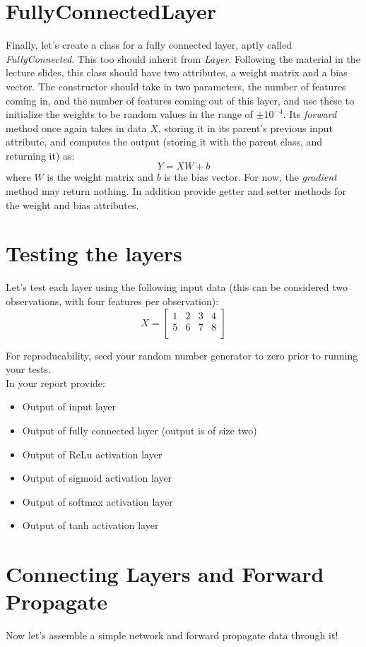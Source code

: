 \documentclass[12pt]{article}
\begin{document}
\section{FullyConnectedLayer}
Finally, let's create a class for a fully connected layer, aptly called \emph{FullyConnected}.  This too should inherit from \emph{Layer}.  Following the material in the lecture slides, this class should have two attributes, a weight matrix and a bias vector.  The constructor should take in two parameters, the number of features coming in, and the number of features coming out of this layer, and use these to initialize the weights to be random values in the range of $\pm 10^{-4}$.   Its \emph{forward} method once again takes in data $X$, storing it in its parent's previous input attribute, and computes the output (storing it with the parent class, and returning it) as:
$$Y = XW+b$$
where $W$ is the weight matrix and $b$ is the bias vector.  For now, the \emph{gradient} method may return nothing.  In addition provide getter and setter methods for the weight and bias attributes.
\newpage
\section{Testing the layers}
Let's test each layer using the following input data (this can be considered two observations, with four features per observation):
$$X = \begin{bmatrix}
1 & 2 & 3 & 4\\
5 & 6 & 7 & 8\\
\end{bmatrix}$$

\noindent
For reproducability, seed your random number generator to zero prior to running your tests.\\

\noindent
In your report provide:
\begin{itemize}
\item Output of input layer
\item Output of fully connected layer (output is of size two)
\item Output of ReLu activation layer
\item Output of sigmoid activation layer
\item Output of softmax activation layer
\item Output of tanh activation layer

\end{itemize}

\newpage
\section{Connecting Layers and Forward Propagate}
Now let's assemble a simple network and forward propagate data through it!\\
\end{document}
